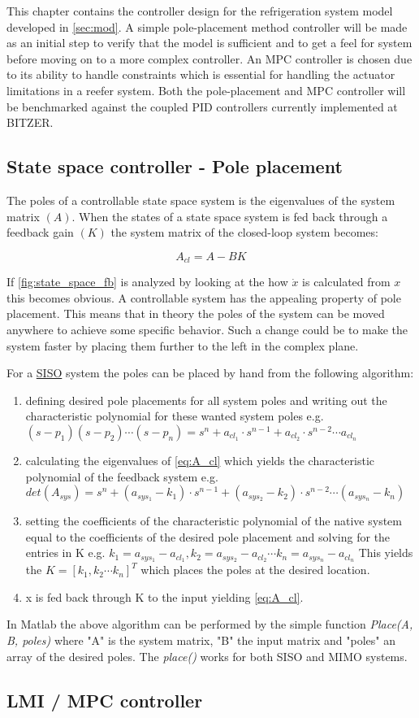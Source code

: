 This chapter contains the controller design for the refrigeration system model developed in \cref{sec:mod}. A simple pole-placement method controller will be made as an initial step to verify that the model is sufficient and to get a feel for system before moving on to a more complex controller. An MPC controller is chosen due to its ability to handle constraints which is essential for handling the actuator limitations in a reefer system. Both the pole-placement and MPC controller will be benchmarked against the coupled PID controllers currently implemented at BITZER.


\subsection{State space controller - Pole placement}
The poles of a controllable state space system is the eigenvalues of the system matrix $(A)$. When the states of a state space system is fed back through a feedback gain $(K)$ the system matrix of the closed-loop system becomes:

\begin{equation} \label{eq:A_cl}
	A_{cl} = A-BK
\end{equation}

If \cref{fig:state_space_fb} is analyzed by looking at the how $\dot{x}$ is calculated from $x$ this becomes obvious. A controllable system has the appealing property of  pole placement. This means that in theory the poles of the system can be moved anywhere to achieve some specific behavior. Such a change could be to make the system faster by placing them further to the left in the complex plane.

For a \underline{SISO} system the poles can be placed by hand from the following algorithm:
\begin{enumerate}
	\item defining desired pole placements for all system poles and writing out the characteristic polynomial for these wanted system poles e.g.
	$(s-p_1)(s-p_2) \cdots (s-p_n) = s^n + a_{cl_1} \cdot s^{n-1} + a_{cl_2} \cdot s^{n-2} \cdots a_{cl_n}$
	\item calculating the eigenvalues of \cref{eq:A_cl} which yields the characteristic polynomial of the feedback system e.g.
	$det(A_{sys}) = s^n + (a_{sys_1}-k_1) \cdot s^{n-1} + (a_{sys_2}-k_2) \cdot s^{n-2} \cdots (a_{sys_n}-k_n)$
	\item setting the coefficients of the characteristic polynomial of the native system equal to the coefficients of the desired pole placement and solving for the entries in K e.g.
	$ k_1 = a_{sys_1}-a_{cl_1}, k_2 = a_{sys_2}-a_{cl_2} \cdots k_n = a_{sys_n}-a_{cl_n} $
	 This yields the $ K = [k_1, k_2 \cdots k_n]^T $ which places the poles at the desired location.
	\item x is fed back through K to the input yielding \cref{eq:A_cl}.
\end{enumerate}

In Matlab the above algorithm can be performed by the simple function \textit{Place(A, B, poles)} where "A" is the system matrix, "B" the input matrix and "poles" an array of the desired poles. The \textit{place()} works for both SISO and MIMO systems.







\subsection{LMI / MPC controller}
